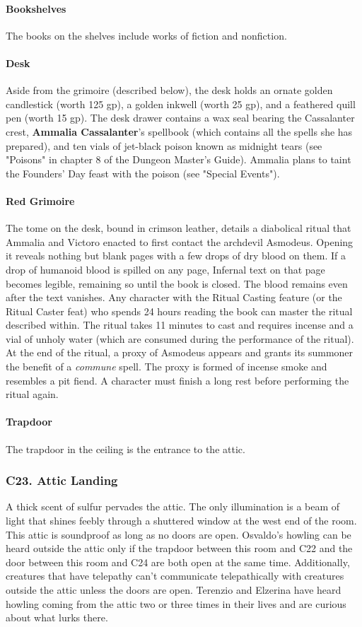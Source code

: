 \documentclass[10pt,a4paper,twoside,twocolumn,openany,nodeprecatedcode]{dndbook}
\begin{document}
\paragraph{Bookshelves}
The books on the shelves include works of fiction and nonfiction.
\paragraph{Desk}
Aside from the grimoire (described below), the desk holds an ornate golden candlestick (worth 125 gp), a golden inkwell (worth 25 gp), and a feathered quill pen (worth 15 gp). The desk drawer contains a wax seal bearing the Cassalanter crest, \textbf{Ammalia Cassalanter}'s spellbook (which contains all the spells she has prepared), and ten vials of jet-black poison known as midnight tears (see "Poisons" in chapter 8 of the Dungeon Master's Guide). Ammalia plans to taint the Founders' Day feast with the poison (see "Special Events").
\paragraph{Red Grimoire}
The tome on the desk, bound in crimson leather, details a diabolical ritual that Ammalia and Victoro enacted to first contact the archdevil Asmodeus. Opening it reveals nothing but blank pages with a few drops of dry blood on them. If a drop of humanoid blood is spilled on any page, Infernal text on that page becomes legible, remaining so until the book is closed. The blood remains even after the text vanishes.
Any character with the Ritual Casting feature (or the Ritual Caster feat) who spends 24 hours reading the book can master the ritual described within. The ritual takes 11 minutes to cast and requires incense and a vial of unholy water (which are consumed during the performance of the ritual). At the end of the ritual, a proxy of Asmodeus appears and grants its summoner the benefit of a \textit{commune} spell. The proxy is formed of incense smoke and resembles a pit fiend. A character must finish a long rest before performing the ritual again.
\paragraph{Trapdoor}
The trapdoor in the ceiling is the entrance to the attic.
\subsubsection{C23. Attic Landing}
A thick scent of sulfur pervades the attic. The only illumination is a beam of light that shines feebly through a shuttered window at the west end of the room.
This attic is soundproof as long as no doors are open. Osvaldo's howling can be heard outside the attic only if the trapdoor between this room and C22 and the door between this room and C24 are both open at the same time. Additionally, creatures that have telepathy can't communicate telepathically with creatures outside the attic unless the doors are open.
Terenzio and Elzerina have heard howling coming from the attic two or three times in their lives and are curious about what lurks there.
\end{document}

